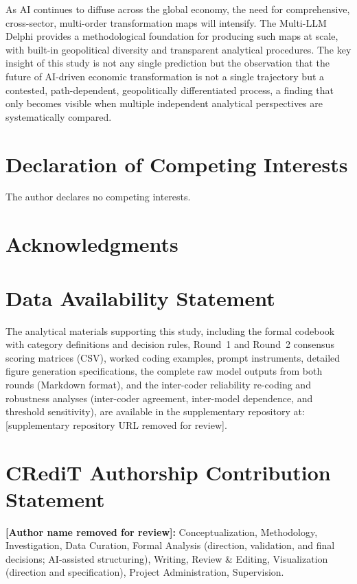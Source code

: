 \documentclass[preprint,review,12pt]{elsarticle}
\begin{document}
As AI continues to diffuse across the global economy, the need for comprehensive, cross-sector, multi-order transformation maps will intensify. The Multi-LLM Delphi provides a methodological foundation for producing such maps at scale, with built-in geopolitical diversity and transparent analytical procedures. The key insight of this study is not any single prediction but the observation that the future of AI-driven economic transformation is not a single trajectory but a contested, path-dependent, geopolitically differentiated process, a finding that only becomes visible when multiple independent analytical perspectives are systematically compared.


\section*{Declaration of Competing Interests}

The author declares no competing interests.

\section*{Acknowledgments}

\section*{Data Availability Statement}

The analytical materials supporting this study, including the formal codebook with category definitions and decision rules, Round~1 and Round~2 consensus scoring matrices (CSV), worked coding examples, prompt instruments, detailed figure generation specifications, the complete raw model outputs from both rounds (Markdown format), and the inter-coder reliability re-coding and robustness analyses (inter-coder agreement, inter-model dependence, and threshold sensitivity), are available in the supplementary repository at: [supplementary repository URL removed for review].

\section*{CRediT Authorship Contribution Statement}

\textbf{[Author name removed for review]:} Conceptualization, Methodology, Investigation, Data Curation, Formal Analysis (direction, validation, and final decisions; AI-assisted structuring), Writing, Review \& Editing, Visualization (direction and specification), Project Administration, Supervision.
\end{document}
